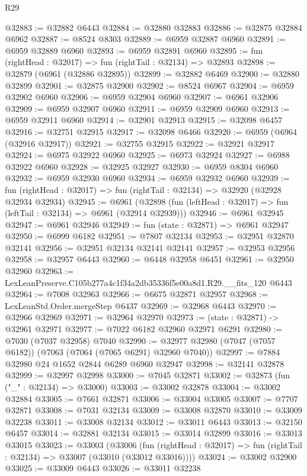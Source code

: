 \begin{lexlean}{R29}
\begin{coremodule}
@32883 := @32882 @6443
@32884 := @32880 @32883
@32886 := @32875 @32884 @6962
@32887 := @8524 @8303
@32889 := @6959 @32887 @6960
@32891 := @6959 @32889 @6960
@32893 := @6959 @32891 @6960
@32895 := fun (rightHead : @32017) => fun (rightTail : @32134) => @32893
@32898 := @32879 (@6961 (@32886 @32895))
@32899 := @32882 @6469
@32900 := @32880 @32899
@32901 := @32875 @32900
@32902 := @8524 @6967
@32904 := @6959 @32902 @6960
@32906 := @6959 @32904 @6960
@32907 := @6961 @32906
@32909 := @6959 @32907 @6960
@32911 := @6959 @32909 @6960
@32913 := @6959 @32911 @6960
@32914 := @32901 @32913
@32915 := @32098 @6457
@32916 := @32751 @32915
@32917 := @32098 @6466
@32920 := @6959 (@6964 (@32916 @32917))
@32921 := @32755 @32915
@32922 := @32921 @32917
@32924 := @6975 @32922 @6960
@32925 := @6973 @32924
@32927 := @6988 @32922 @6960
@32928 := @32925 @32927
@32930 := @6959 @8304 @6960
@32932 := @6959 @32930 @6960
@32934 := @6959 @32932 @6960
@32939 := fun (rightHead : @32017) => fun (rightTail : @32134) => @32920 (@32928 @32934 @32934)
@32945 := @6961
    (@32898 (fun (leftHead : @32017) => fun (leftTail : @32134) => @6961 (@32914 @32939)))
@32946 := @6961 @32945
@32947 := @6961 @32946
@32949 := fun (state : @32871) => @6961 @32947
@32950 := @6999 @6182
@32951 := @7807 @32134
@32953 := @32951 @32870 @32141
@32956 := @32951 @32134 @32141 @32141
@32957 := @32953 @32956
@32958 := @32957 @6443
@32960 := @6448 @32958 @6451
@32961 := @32950 @32960
@32963 := LexLeanPreserve.C105b277a4c1f34a2db35336f5e00a8d1.R29.__fits_120 @6443
@32964 := @7008 @32963
@32966 := @6675 @32871 @32957
@32968 := LexLeanStd.Order.mergeStep @6437
@32969 := @32968 @6443
@32970 := @32966 @32969
@32971 := @32964 @32970
@32973 := (state : @32871) -> @32961 @32971
@32977 := @7022 @6182 @32960 @32971 @6291
@32980 := @7030 (@7037 @32958) @7040
@32990 := @32977 @32980 (@7047 (@7057 @6182)) (@7063 (@7064 (@7065 @6291) @32960 @7040))
@32997 := @7884 @32980 @24 @1652 @2844 @6289 @6960 @32947
@32998 := @32141 @32878
@32999 := @32997 @32998
@33000 := @7045 @32871
@33002 := @32873 (fun ("_" : @32134) => @33000)
@33003 := @33002 @32878
@33004 := @33002 @32884
@33005 := @7661 @32871
@33006 := @33004 @33005
@33007 := @7707 @32871
@33008 := @7031 @32134
@33009 := @33008 @32870
@33010 := @33009 @32238
@33011 := @33008 @32134
@33012 := @33011 @6443
@33013 := @32150 @6457
@33014 := @32881 @32134
@33015 := @33014 @32899
@33016 := @33013 @33015
@33023 := @33003
    (@33006
      (fun (rightHead : @32017) => fun (rightTail : @32134) => @33007 (@33010 (@33012 @33016))))
@33024 := @33002 @32900
@33025 := @33009 @6443
@33026 := @33011 @32238

\end{coremodule}
\end{lexlean}

